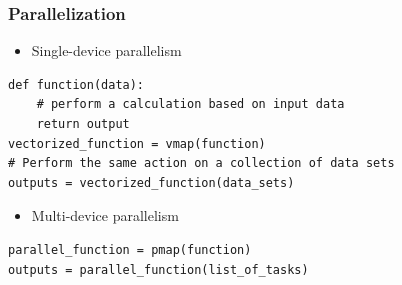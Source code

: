 \begin{frame}[fragile]
    \frametitle{Parallelization}

    \begin{figure}
       \begin{center}
       \end{center}
    \end{figure}
    
\end{frame}



\begin{frame}[fragile]

    \begin{itemize}
        \item Single-device parallelism
    \end{itemize}
    
    \begin{verbatim}
def function(data):
    # perform a calculation based on input data
    return output
vectorized_function = vmap(function)  
# Perform the same action on a collection of data sets
outputs = vectorized_function(data_sets)   
    \end{verbatim}

    \vspace{0.5em}
    \vspace{0.5em}
    \begin{itemize}
        \item Multi-device parallelism
    \end{itemize}

    \begin{verbatim}
parallel_function = pmap(function)  
outputs = parallel_function(list_of_tasks)  
    \end{verbatim}

\end{frame}



